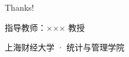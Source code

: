 \documentclass{beamer}
\begin{document}
\begin{frame}
    \begin{center}
        {\Huge\calligra Thanks!}
        
        \vspace{1cm}
        \normalsize 指导教师：××× 教授
        
        \vspace{0.5cm}
        上海财经大学 · 统计与管理学院
    \end{center}
\end{frame}
\end{document}

